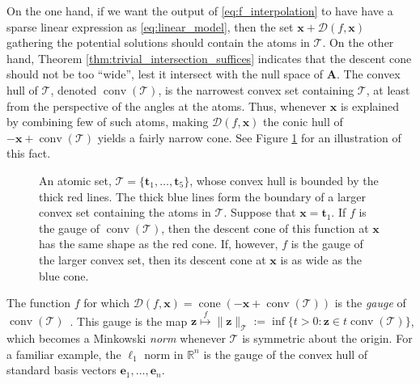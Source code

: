 On the one hand, if we want the output of \eqref{eq:f_interpolation} to have have a sparse linear expression as \eqref{eq:linear_model}, then the set $\mathbf{x} + \mathcal{D}(f, \mathbf{x})$ gathering the potential solutions should contain the atoms in $\mathcal{T}$. On the other hand, Theorem \ref{thm:trivial_intersection_suffices} indicates that the descent cone should not be too ``wide'', lest it intersect with the null space of $\mathbf{A}$. The convex hull of $\mathcal{T}$, denoted $\operatorname{conv}(\mathcal{T})$, is the narrowest convex set containing $\mathcal{T}$, at least from the perspective of the angles at the atoms. Thus, whenever $\mathbf{x}$ is explained by combining few of such atoms, making $\mathcal{D}(f, \mathbf{x})$ the conic hull of $-\mathbf{x} + \operatorname{conv}(\mathcal{T})$ yields a fairly narrow cone. See Figure \ref{fig:illustration_convex_hull} for an illustration of this fact.

\clearpage

\begin{figure}[H]
    \centering
    
    \caption[An atomic set and related descent cones]{An atomic set, $\mathcal{T} = \{\mathbf{t}_1, \dots, \mathbf{t}_5\}$, whose convex hull is bounded by the thick red lines. The thick blue lines form the boundary of a larger convex set containing the atoms in $\mathcal{T}$. Suppose that $\mathbf{x} = \mathbf{t}_1$. If $f$ is the gauge of $\operatorname{conv} \left ( \mathcal{T} \right )$, then the descent cone of this function at $\mathbf{x}$ has the same shape as the red cone. If, however, $f$ is the gauge of the larger convex set, then its descent cone at $\mathbf{x}$ is as wide as the blue cone.}
    \label{fig:illustration_convex_hull}
\end{figure}

The function $f$ for which $\mathcal{D}(f, \mathbf{x}) = \operatorname{cone} \left ( -\mathbf{x} + \operatorname{conv}(\mathcal{T}) \right )$ is the \emph{gauge} of $\operatorname{conv}(\mathcal{T})$~\cite{chandrasekaran2012}. This gauge is the map $\mathbf{z} \overset{f}{\mapsto} \|\mathbf{z}\|_{\mathcal{T}} := \inf \{ t > 0 : \mathbf{z} \in t \operatorname{conv}(\mathcal{T})\}$, which becomes a Minkowski \emph{norm} whenever $\mathcal{T}$ is symmetric about the origin. For a familiar example, the $\ell_1$ norm in $\mathbb{R}^{n}$ is the gauge of the convex hull of standard basis vectors $\mathbf{e}_1, \dots, \mathbf{e}_n$.

